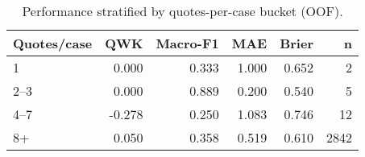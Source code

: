 \begin{table}
\caption{Performance stratified by quotes-per-case bucket (OOF).}
\label{tab:robustness-qpc}
\begin{tabular}{lrrrrr}
\toprule
Quotes/case & QWK & Macro-F1 & MAE & Brier & n \\
\midrule
1 & 0.000 & 0.333 & 1.000 & 0.652 & 2 \\
2–3 & 0.000 & 0.889 & 0.200 & 0.540 & 5 \\
4–7 & -0.278 & 0.250 & 1.083 & 0.746 & 12 \\
8+ & 0.050 & 0.358 & 0.519 & 0.610 & 2842 \\
\bottomrule
\end{tabular}
\end{table}
